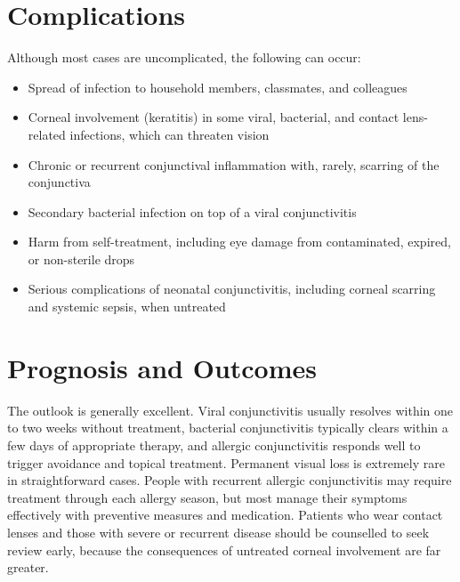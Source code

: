 \section*{Complications}
\medskip
\noindent Although most cases are uncomplicated, the following can occur:
\begin{itemize}
    \item Spread of infection to household members, classmates, and colleagues
    \item Corneal involvement (keratitis) in some viral, bacterial, and contact lens-related infections, which can threaten vision
    \item Chronic or recurrent conjunctival inflammation with, rarely, scarring of the conjunctiva
    \item Secondary bacterial infection on top of a viral conjunctivitis
    \item Harm from self-treatment, including eye damage from contaminated, expired, or non-sterile drops
    \item Serious complications of neonatal conjunctivitis, including corneal scarring and systemic sepsis, when untreated
\end{itemize}

\section*{Prognosis and Outcomes}
The outlook is generally excellent. Viral conjunctivitis usually resolves within one to two weeks without treatment, bacterial conjunctivitis typically clears within a few days of appropriate therapy, and allergic conjunctivitis responds well to trigger avoidance and topical treatment. Permanent visual loss is extremely rare in straightforward cases. People with recurrent allergic conjunctivitis may require treatment through each allergy season, but most manage their symptoms effectively with preventive measures and medication. Patients who wear contact lenses and those with severe or recurrent disease should be counselled to seek review early, because the consequences of untreated corneal involvement are far greater.

